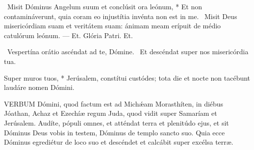 \R\ Misit Dóminus Angelum suum et conclúsit ora leónum, * Et non contamináverunt, quia coram eo injustítia invénta non est in me. \V\ Misit Deus misericórdiam suam et veritátem suam: ánimam meam erípuit de médio catulórum leónum. — Et. Glória Patri. Et.


\V\ Vespertína orátio ascéndat ad te, Dómine. \R\ Et descéndat super nos misericórdia tua.

 Super muros tuos, * Jerúsalem, constítui custódes; tota die et nocte non tacébunt laudáre nomen Dómini.







\lettrine[lines=2]{V}{ERBUM} Dómini, quod factum est ad Michǽam Morasthíten, in diébus Jóathan, Achaz et Ezechíæ regum Juda, quod vidit super Samaríam et Jerúsalem. Audíte, pópuli omnes, et atténdat terra et plenitúdo ejus, et sit Dóminus Deus vobis in testem, Dóminus de templo sancto suo. Quia ecce Dóminus egrediétur de loco suo et descéndet et calcábit super excélsa terræ.

